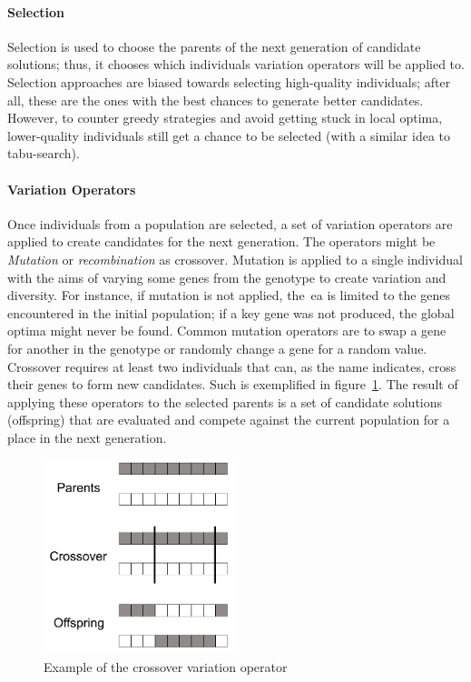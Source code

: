 \paragraph{Selection}

Selection is used to choose the parents of the next generation of candidate solutions; thus, it chooses which individuals variation operators will be applied to. Selection approaches are biased towards selecting high-quality individuals; after all, these are the ones with the best chances to generate better candidates. However, to counter greedy strategies and avoid getting stuck in local optima, lower-quality individuals still get a chance to be selected (with a similar idea to tabu-search). 

\paragraph{Variation Operators}

Once individuals from a population are selected, a set of variation operators are applied to create candidates for the next generation. The operators might be \emph{Mutation} or \emph{recombination} as crossover. Mutation is applied to a single individual with the aims of varying some genes from the genotype to create variation and diversity. For instance, if mutation is not applied, the~\acrshort{ea} is limited to the genes encountered in the initial population; if a key gene was not produced, the global optima might never be found. Common mutation operators are to swap a gene for another in the genotype or randomly change a gene for a random value. Crossover requires at least two individuals that can, as the name indicates, cross their genes to form new candidates. Such is exemplified in figure~\ref{fig:crossoverEX}. The result of applying these operators to the selected parents is a set of candidate solutions (offspring) that are evaluated and compete against the current population for a place in the next generation.

\begin{figure}
\centerline{\includegraphics[width=0.5\textwidth]{figures/EC/crossover-example-bw.png}}
\caption{Example of the crossover variation operator
} \label{fig:crossoverEX}
\end{figure}


